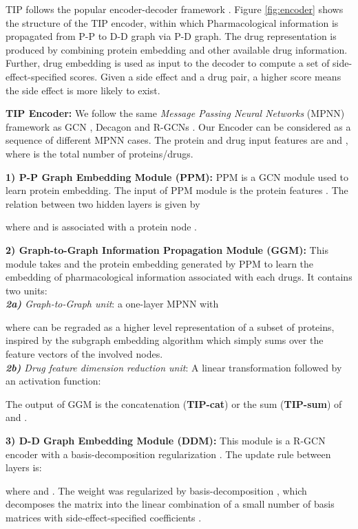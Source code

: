 \documentclass{article}
\begin{document}
	
TIP follows the popular encoder-decoder framework \cite{repre}. Figure \ref{fig:encoder} shows the structure of the TIP encoder, within which Pharmacological information is propagated from P-P to D-D graph via P-D graph. The drug representation is produced by combining protein embedding and other available drug information. Further, drug embedding is used as input to the decoder to compute a set of side-effect-specified scores. Given a side effect and a drug pair, a higher score means the side effect is more likely to exist.


	
\textbf{TIP Encoder:} 
We follow the same \emph{Message Passing Neural Networks} (MPNN) framework \cite{message} as GCN \cite{gcn}, Decagon  \cite{decagon} and R-GCNs \cite{rgcn}. Our Encoder can be considered as a sequence of different MPNN cases. The protein and drug input features are  and , where  is the total number of proteins/drugs. 

\textbf{1) P-P Graph Embedding Module (PPM):} 
PPM is a GCN module \cite{gcn} used to learn protein embedding. The input of PPM module is the protein features . The relation between two hidden layers is given by

where  and  is associated with a protein node . 

\textbf{2) Graph-to-Graph Information Propagation Module (GGM):} This module takes  and the protein embedding generated by PPM to learn the embedding of pharmacological information associated with each drugs. It contains two units: \\
\textit{\textbf{2a)} Graph-to-Graph unit}: a one-layer MPNN with

where  can be regraded as a higher level representation of a subset of proteins, inspired by the subgraph embedding algorithm \cite{subgraph} which simply sums over the feature vectors of the involved nodes.\\ \textit{\textbf{2b)} Drug feature dimension reduction unit}: A linear transformation followed by an activation function:

The output of GGM  is the concatenation (\textbf{TIP-cat}) or the sum (\textbf{TIP-sum}) of  and .

\textbf{3) D-D Graph Embedding Module (DDM):}
This module is a R-GCN encoder with a basis-decomposition  regularization \cite{rgcn}. The update rule between layers is:

where  and .  The weight  was regularized by basis-decomposition \cite{rgcn}, which decomposes the matrix into the linear combination of a small number of basis matrices  with side-effect-specified coefficients .
\end{document}
